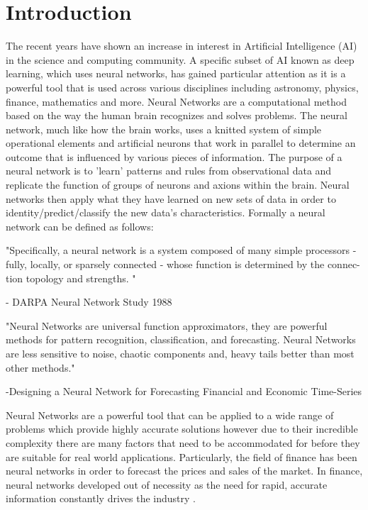 \section{Introduction}

The recent years have shown an increase in interest in Artificial Intelligence (AI) in the science and computing community. A specific subset of AI known as deep learning, which uses neural networks, has gained particular attention as it is a powerful tool that is used across various disciplines including astronomy, physics, finance, mathematics and more. Neural Networks are a computational method based on the way the human brain recognizes and solves problems. The neural network, much like how the brain works, uses a knitted system of simple operational elements and artificial neurons that work in parallel to determine an outcome that is influenced by various pieces of information. The purpose of a neural network is to 'learn' patterns and rules from observational data and replicate the function of groups of neurons and axions within the brain. Neural networks then apply what they have learned on new sets of data in order to identity/predict/classify the new data's characteristics. \cite{kar}Formally a neural network can be defined as follows: 

"Specifically, a neural network is a system composed of many simple processors - fully, locally, or sparsely connected - whose function is determined by the connec- tion topology and strengths. " 
	
    - DARPA Neural Network Study 1988 \cite{DARPANeuralNetworkStudy(U.S.):1988:DNN:576294}
    
    
"Neural Networks are universal function approximators, they are powerful methods for pattern recognition, classification, and forecasting. Neural Networks are less sensitive to noise, chaotic components and, heavy tails better than most other methods."

	-Designing a Neural Network for Forecasting Financial and Economic Time-Series \cite{kaastra1996designing}
    
Neural Networks are a powerful tool that can be applied to a wide range of problems which provide highly accurate solutions however due to their incredible complexity there are many factors that need to be accommodated for before they are suitable for real world applications. Particularly, the field of finance has been neural networks in order to forecast the prices and sales of the market. In finance, neural networks developed out of necessity as the need for rapid, accurate information constantly drives the industry \cite{kar} \cite{kaastra1996designing}.

